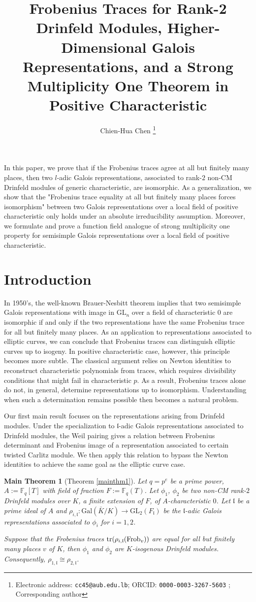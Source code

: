 \documentclass[20pt, oneside]{article}   	%
\title{Frobenius Traces for Rank-2 Drinfeld Modules, Higher-Dimensional Galois Representations, and a Strong Multiplicity One Theorem in Positive Characteristic}
\author{Chien-Hua Chen \thanks{Electronic address: \texttt{cc45@aub.edu.lb}; ORCID: \texttt{0000-0003-3267-5603} ; Corresponding author}}
\affil{}
\newtheorem{thmm}{Main Theorem}
\theoremstyle{definition}
\newcommand{\F}{\mathbb{F}}
\newcommand{\fl}{\mathfrak{l}}
\newcommand{\Gal}{\mathrm{Gal}}
\newcommand{\GL}{\mathrm{GL}}
\begin{document}
\maketitle
\abstract

In this paper, we prove that if the Frobenius traces agree at all but finitely many places, then two $l$-adic Galois representations, associated to rank-$2$ non-CM Drinfeld modules of generic characteristic, are isomorphic. As a generalization, we show that  the "Frobenius trace equality at all but finitely many places forces isomorphism" between two Galois representations over a local field of positive characteristic only holds under an absolute irreducibility assumption. Moreover, we formulate and prove a function field analogue of strong multiplicity one property for semisimple Galois representations over a local field of positive characteristic.

\section {Introduction}


In 1950's, the well-known Brauer-Nesbitt theorem implies that two semisimple Galois representations with image in $\GL_n$ over a field of characteristic $0$ are isomorphic if and only if the two representations have the same Frobenius trace for all but finitely many places. As an application to representations associated to elliptic curves, we can conclude that Frobenius traces can distinguish elliptic curves up to isogeny. In positive characteristic case, however, this principle becomes more subtle. The classical argument relies on Newton identities to reconstruct characteristic polynomials from traces, which requires divisibility conditions that might fail in characteristic $p$. As a result, Frobenius traces alone do not, in general, determine representations up to isomorphism. Understanding when such a determination remains possible then becomes a natural problem.

Our first main result focuses on the representations arising from Drinfeld modules. Under the specialization to $\fl$-adic Galois representations associated to Drinfeld modules, the Weil pairing gives a  relation between Frobenius determinant and Frobenius image of a representation associated to certain twisted Carlitz module. We then apply this relation to bypass the Newton identities to achieve the same goal as the elliptic curve case. 

\begin{thmm}[Theorem \ref{mainthm1}]
Let $q=p^e$ be a prime power, $A:=\F_q[T]$ with field of fraction $F:=\F_q(T)$. Let $\phi_1$, $\phi_2$ be two non-CM rank-$2$ Drinfeld modules over $K$, a finite extension of $F$, of $A$-characteristic $0$. Let $\fl$ be a prime ideal of $A$ and $\rho_{i,\fl}:\Gal(\bar{K}/K)\rightarrow \GL_2(F_\fl)$  be the $\fl$-adic Galois representations associated to $\phi_i$ for $i=1,2$. 

Suppose that the Frobenius traces ${\rm{tr}}(\rho_{i,\fl}({\rm Frob}_{v}))$ are equal for all but finitely many places $v$ of $K$, then $\phi_1$ and $\phi_2$ are $K$-isogenous Drinfeld modules. Consequently, $\rho_{1,\fl}\cong\rho_{2,\fl}$.
\end{thmm}
\end{document}
